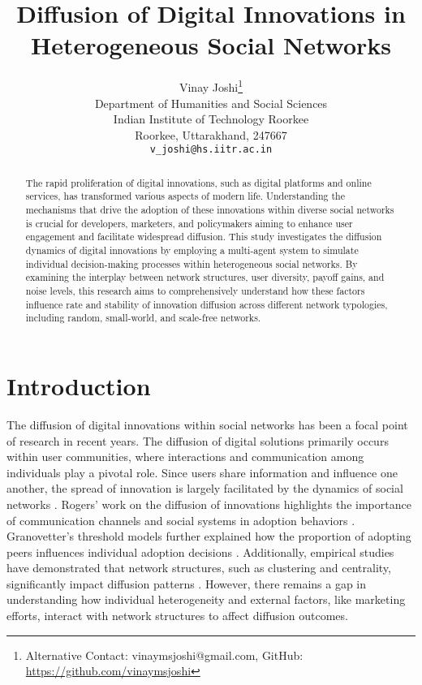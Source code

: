 \documentclass{article} %
\title{Diffusion of Digital Innovations in Heterogeneous Social Networks\\[0.5em]
\large }
\author{
Vinay Joshi\thanks{Alternative Contact: vinaymsjoshi@gmail.com, GitHub:  \url{https://github.com/vinaymsjoshi}} \\
Department of Humanities and Social Sciences\\
Indian Institute of Technology Roorkee\\
Roorkee, Uttarakhand, 247667 \\
\texttt{v\_joshi@hs.iitr.ac.in}
}
\begin{document}
\maketitle

\begin{abstract}
The rapid proliferation of digital innovations, such as digital platforms and online services, has transformed various aspects of modern life. Understanding the mechanisms that drive the adoption of these innovations within diverse social networks is crucial for developers, marketers, and policymakers aiming to enhance user engagement and facilitate widespread diffusion. This study investigates the diffusion dynamics of digital innovations by employing a multi-agent system to simulate individual decision-making processes within heterogeneous social networks. By examining the interplay between network structures, user diversity, payoff gains, and noise levels, this research aims to comprehensively understand how these factors influence rate and stability of innovation diffusion across different network typologies, including random, small-world, and scale-free networks.
\end{abstract}

\section{Introduction}

The diffusion of digital innovations within social networks has been a focal point of research in recent years. The diffusion of digital solutions primarily occurs within user communities, where interactions and communication among individuals play a pivotal role. Since users share information and influence one another, the spread of innovation is largely facilitated by the dynamics of social networks \cite{amini2012alternative, rai2016agent}. Rogers' work on the diffusion of innovations highlights the importance of communication channels and social systems in adoption behaviors \cite{rogers_diffusion_2003}. Granovetter's threshold models further explained how the proportion of adopting peers influences individual adoption decisions \cite{granovetter_threshold_1978}. Additionally, empirical studies have demonstrated that network structures, such as clustering and centrality, significantly impact diffusion patterns \cite{valente_network_1996}. However, there remains a gap in understanding how individual heterogeneity and external factors, like marketing efforts, interact with network structures to affect diffusion outcomes.
\end{document}
